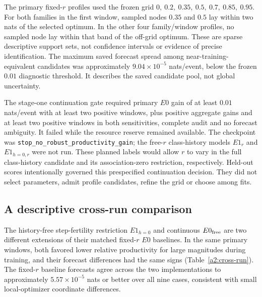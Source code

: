 The primary fixed-\(r\) profiles used the frozen grid
\(0,\ 0.2,\ 0.35,\ 0.5,\ 0.7,\ 0.85,\ 0.95\). For both families in the
first window, sampled nodes \(0.35\) and \(0.5\) lay within two nats of
the selected optimum. In the other four family/window profiles, no
sampled node lay within that band of the off-grid optimum. These are
sparse descriptive support sets, not confidence intervals or evidence
of precise identification. The maximum saved forecast spread among
near-training-equivalent candidates was approximately
\(9.04\times10^{-5}\) nats/event, below the frozen \(0.01\) diagnostic
threshold. It describes the saved candidate pool, not global uncertainty.

The stage-one continuation gate required primary \(E0\) gain of at least
\(0.01\) nats/event with at least two positive windows, plus positive
aggregate gains and at least two positive windows in both sensitivities,
complete audit and no forecast ambiguity. It failed while the resource
reserve remained available. The checkpoint was
\texttt{stop\_no\_robust\_productivity\_gain}; the free-\(r\) class-history
models \(E1_r\) and \(E1_{h=0,r}\) were not run. These planned labels
would allow \(r\) to vary in the full class-history candidate and its
association-zero restriction, respectively. Held-out scores intentionally governed this
prespecified continuation decision. They did not select parameters,
admit profile candidates, refine the grid or choose among fits.

\subsection{A descriptive cross-run comparison}

The history-free step-fertility restriction \(E1_{h=0}\) and continuous
\(E0_{\rm free}\) are two different extensions of their matched
fixed-\(r\) \(E0\) baselines. In the same primary windows, both favored
lower relative productivity for large magnitudes during training, and
their forecast differences had the same signs
(Table~\ref{a2:cross-run}). The fixed-\(r\) baseline forecasts agree across
the two implementations to approximately \(5.57\times10^{-5}\) nats
or better over all nine cases, consistent with small local-optimizer
coordinate differences.

